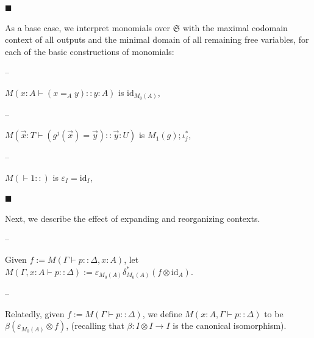 \par\noindent  $\blacksquare$ 
 
As a base case, we interpret monomials over $\mathfrak{S}$ with the maximal codomain context of all outputs and the minimal domain of all remaining free variables, for each of the basic constructions of monomials:\par
  
\par\noindent  – 
 
$M\left(x:A\vdash(x=_{A}y)::y:A\right)$ is $\mathrm{id}_{M_{0}(A)}$,\par
 
 
 
\par\noindent  – 
 
$M\left(\vec{x}:T\vdash(g^{j}(\vec{x})=\vec{y})::\vec{y}:U\right)$ is $M_{1}(g);\iota^{*}_{j}$,\par
 
 
 
\par\noindent  – 
 
$M\left(\vdash 1::\right)$ is $\varepsilon_{I}=\mathrm{id}_{I}$,\par
 
 
  
 
 
\par\noindent  $\blacksquare$ 
 
Next, we describe the effect of expanding and reorganizing contexts.\par
  
\par\noindent  – 
 
Given $f:=M(\Gamma\vdash p::\Delta,x:A)$, let $M(\Gamma,x:A\vdash p::\Delta):=\varepsilon_{M_{0}(A)}\delta^{*}_{M_{0}(A)}(f%
\otimes\mathrm{id}_{A})$.\par
 
 
 
\par\noindent  – 
 
Relatedly, given $f:=M(\Gamma\vdash p::\Delta)$, we define $M(x:A,\Gamma\vdash p::\Delta)$ to be $\beta(\varepsilon_{M_{0}(A)}\otimes f)$, (recalling that $\beta:I\otimes I\to I$ is the canonical isomorphism).\par
 
